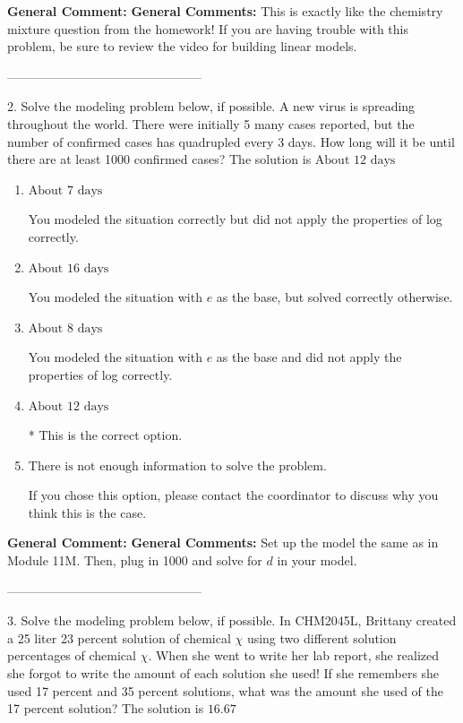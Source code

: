 \documentclass{extbook}[14pt]
\begin{document}
\textbf{General Comment:} \textbf{General Comments:} This is exactly like the chemistry mixture question from the homework! If you are having trouble with this problem, be sure to review the video for building linear models. 

-----------------------------------------------

2. Solve the modeling problem below, if possible.
A new virus is spreading throughout the world. There were initially 5 many cases reported, but the number of confirmed cases has quadrupled every 3 days. How long will it be until there are at least 1000 confirmed cases? 
The solution is $ \text{About } 12 \text{ days} $ 

\begin{enumerate}[label=\Alph*.] 
\item $ \text{About } 7 \text{ days} $ 

 You modeled the situation correctly but did not apply the properties of log correctly. 
\item $ \text{About } 16 \text{ days} $ 

 You modeled the situation with $e$ as the base, but solved correctly otherwise. 
\item $ \text{About } 8 \text{ days} $ 

 You modeled the situation with $e$ as the base and did not apply the properties of log correctly. 
\item $ \text{About } 12 \text{ days} $ 

 * This is the correct option. 
\item $ \text{There is not enough information to solve the problem.} $ 

 If you chose this option, please contact the coordinator to discuss why you think this is the case. 
\end{enumerate} 
 
\textbf{General Comment:} \textbf{General Comments:} Set up the model the same as in Module 11M. Then, plug in 1000 and solve for $d$ in your model. 

-----------------------------------------------

3. Solve the modeling problem below, if possible.
In CHM2045L, Brittany created a 25 liter 23 percent solution of chemical $\chi$ using two different solution percentages of chemical $\chi$. When she went to write her lab report, she realized she forgot to write the amount of each solution she used! If she remembers she used 17 percent and 35 percent solutions, what was the amount she used of the 17 percent solution? 
The solution is $ 16.67 $ 
\end{document}
